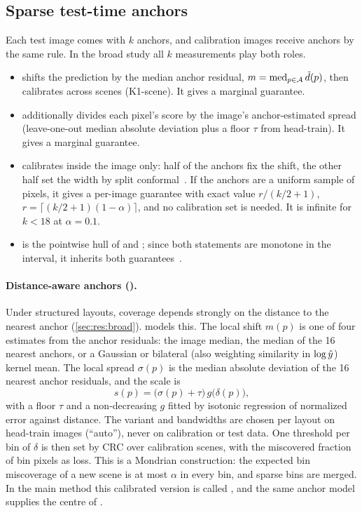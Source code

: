 \subsection{Sparse test-time anchors}
\label{sec:method:anchors}
Each test image comes with $k$ anchors, and calibration images receive anchors by the same rule.
In the broad study all $k$ measurements play both roles.
\begin{itemize}[leftmargin=*,itemsep=1pt,topsep=2pt]
\item \mRescale shifts the prediction by the median anchor residual, $m=\operatorname{med}_{p\in\mathcal{A}}\tilde{d}(p)$, then calibrates across scenes (K1-scene). It gives a marginal guarantee.
\item \mHybrid additionally divides each pixel's score by the image's anchor-estimated spread (leave-one-out median absolute deviation plus a floor $\tau$ from head-train). It gives a marginal guarantee.
\item \mLocal calibrates inside the image only: half of the anchors fix the shift, the other half set the width by split conformal~\cite{mao2024spatial}.
If the anchors are a uniform sample of pixels, it gives a per-image guarantee with exact value $r/(k/2+1)$, $r=\lceil(k/2+1)(1-\alpha)\rceil$, and no calibration set is needed.
It is infinite for $k<18$ at $\alpha=0.1$.
\item \mBoth is the pointwise hull of \mHybrid and \mLocal; since both statements are monotone in the interval, it inherits both guarantees~\cite{gasparin2024merging}.
\end{itemize}

\paragraph{Distance-aware anchors (\mDist).}
Under structured layouts, coverage depends strongly on the distance to the nearest anchor (\cref{sec:res:broad}).
\mDist models this.
The local shift $m(p)$ is one of four estimates from the anchor residuals: the image median, the median of the 16 nearest anchors, or a Gaussian or bilateral (also weighting similarity in $\log\hat{y}$) kernel mean.
The local spread $\sigma(p)$ is the median absolute deviation of the 16 nearest anchor residuals, and the scale is
\begin{equation}
s(p)=\big(\sigma(p)+\tau\big)\,g\big(\delta(p)\big),
\label{eq:scale}
\end{equation}
with a floor $\tau$ and a non-decreasing $g$ fitted by isotonic regression of normalized error against distance.
The variant and bandwidths are chosen per layout on head-train images (``auto''), never on calibration or test data.
One threshold per bin of $\delta$ is then set by CRC over calibration scenes, with the miscovered fraction of bin pixels as loss.
This is a Mondrian construction: the expected bin miscoverage of a new scene is at most $\alpha$ in every bin, and sparse bins are merged.
In the main method this calibrated version is called \mDistSplit, and the same anchor model supplies the centre of \mDual.

